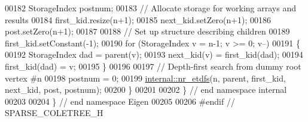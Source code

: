\begin{DoxyCode}
00182   StorageIndex postnum; 
00183   \textcolor{comment}{// Allocate storage for working arrays and results }
00184   first\_kid.resize(n+1); 
00185   next\_kid.setZero(n+1);
00186   post.setZero(n+1);
00187   
00188   \textcolor{comment}{// Set up structure describing children}
00189   first\_kid.setConstant(-1); 
00190   \textcolor{keywordflow}{for} (StorageIndex v = n-1; v >= 0; v--) 
00191   \{
00192     StorageIndex dad = parent(v);
00193     next\_kid(v) = first\_kid(dad); 
00194     first\_kid(dad) = v; 
00195   \}
00196   
00197   \textcolor{comment}{// Depth-first search from dummy root vertex #n}
00198   postnum = 0; 
00199   \hyperlink{namespace_eigen_1_1internal_acbd726e03f667e0dc788c6b4e92d61ec}{internal::nr\_etdfs}(n, parent, first\_kid, next\_kid, post, postnum);
00200 \}
00201 
00202 \} \textcolor{comment}{// end namespace internal}
00203 
00204 \} \textcolor{comment}{// end namespace Eigen}
00205 
00206 \textcolor{preprocessor}{#endif // SPARSE\_COLETREE\_H}
\end{DoxyCode}
